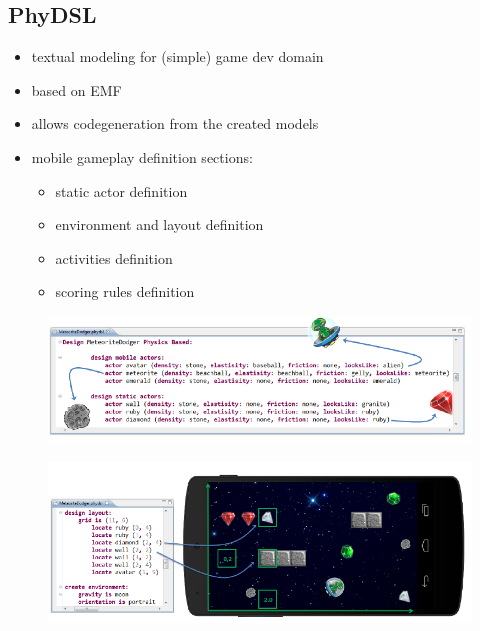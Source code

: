 \documentclass[runningheads,a4paper]{llncs}
\begin{document}
  
  \subsection{PhyDSL}

  \begin{itemize}
  \item textual modeling for (simple) game dev domain
  \item based on EMF
  \item allows codegeneration from the created models
  \item mobile gameplay definition sections:
    \begin{itemize}
    \item static actor definition
    \item environment and layout definition
    \item activities definition
    \item scoring rules definition
    \end{itemize}
  
  \end{itemize}
     \begin{figure}[htbp]
      \centering
      \includegraphics[width=\textwidth]{images/PhyDSL1.PNG}
    \end{figure}
       \begin{figure}[htbp]
      \centering
      \includegraphics[width=\textwidth]{images/PhyDSL2.PNG}
    \end{figure}
\end{document}
